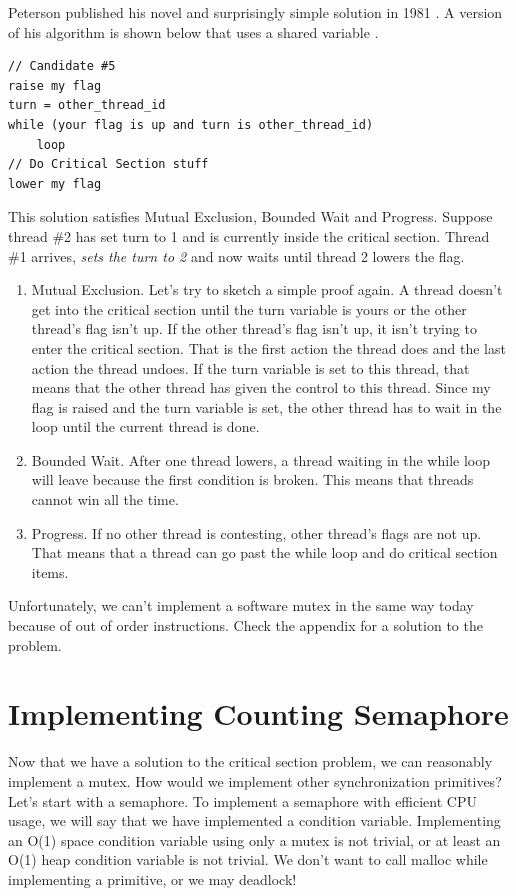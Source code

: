 Peterson published his novel and surprisingly simple solution in 1981 \cite{Peterson1981MythsAT}.
A version of his algorithm is shown below that uses a shared variable .

\begin{lstlisting}
// Candidate #5
raise my flag
turn = other_thread_id
while (your flag is up and turn is other_thread_id)
    loop
// Do Critical Section stuff
lower my flag
\end{lstlisting}

This solution satisfies Mutual Exclusion, Bounded Wait and Progress.
Suppose thread \#2 has set turn to 1 and is currently inside the critical section.
Thread \#1 arrives, \emph{sets the turn to 2} and now waits until thread 2 lowers the flag.

\begin{enumerate}
\item Mutual Exclusion. Let's try to sketch a simple proof again.
  A thread doesn't get into the critical section until the turn variable is yours or the other thread's flag isn't up.
  If the other thread's flag isn't up, it isn't trying to enter the critical section.
  That is the first action the thread does and the last action the thread undoes.
  If the turn variable is set to this thread, that means that the other thread has given the control to this thread.
  Since my flag is raised and the turn variable is set, the other thread has to wait in the loop until the current thread is done.
\item Bounded Wait. After one thread lowers, a thread waiting in the while loop will leave because the first condition is broken. This means that threads cannot win all the time.
\item Progress. If no other thread is contesting, other thread's flags are not up. That means that a thread can go past the while loop and do critical section items.
\end{enumerate}

Unfortunately, we can't implement a software mutex in the same way today because of out of order instructions. Check the appendix for a solution to the problem.

\section{Implementing Counting Semaphore}

Now that we have a solution to the critical section problem, we can reasonably implement a mutex.
How would we implement other synchronization primitives?
Let's start with a semaphore.
To implement a semaphore with efficient CPU usage, we will say that we have implemented a condition variable.
Implementing an O(1) space condition variable using only a mutex is not trivial, or at least an O(1) heap condition variable is not trivial.
We don't want to call malloc while implementing a primitive, or we may deadlock!


